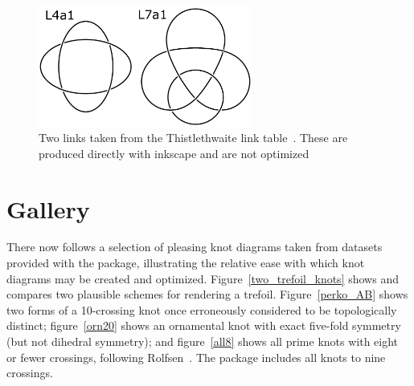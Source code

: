 \documentclass{birkjour}
\theoremstyle{definition}
\theoremstyle{remark}
\numberwithin{equation}{section}
\begin{document}
\begin{figure}[htbp]
  \begin{center}
\includegraphics[width=7cm]{L4a1_L7a1}  %
\caption{Two links \label{thistlethwaite} taken from the
  Thistlethwaite link table~\cite{hoste1998}.  These are produced
  directly with inkscape and are not optimized}
  \end{center}
\end{figure}


\clearpage
\section{Gallery}

There now follows a selection of pleasing knot diagrams taken from
datasets provided with the package, illustrating the relative ease
with which knot diagrams may be created and optimized.
Figure~\ref{two_trefoil_knots} shows and compares two plausible
schemes for rendering a trefoil.  Figure~\ref{perko_AB} shows two
forms of a 10-crossing knot once erroneously considered to be
topologically distinct; figure~\ref{orn20} shows an ornamental knot
with exact five-fold symmetry (but not dihedral symmetry); and
figure~\ref{all8} shows all prime knots with eight or fewer crossings,
following Rolfsen~\cite{rolfsen1976}.  The package includes all knots
to nine crossings.
\end{document}
